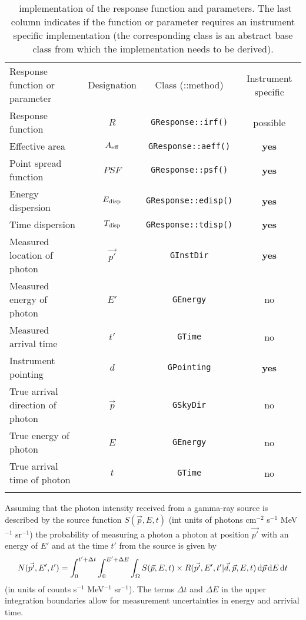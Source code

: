 \documentclass{article}[12pt,a4]
\begin{document}
\begin{table}[!h]
\caption{\this\ implementation of the response function and parameters. 
The last column indicates if the function or parameter requires an
instrument specific implementation (the corresponding class is an abstract base class
from which the implementation needs to be derived).
\label{tab:respar}}
\begin{center}
\begin{tabular}{lccc}
\hline
\hline
\noalign{\smallskip}
Response function or parameter & Designation & Class (::method) & Instrument specific \\
\noalign{\smallskip}
\hline
\noalign{\smallskip}
Response function & $R$ & {\tt GResponse::irf()} & possible \\
Effective area & $A_{\rm eff}$ & {\tt GResponse::aeff()} & {\bf yes} \\
Point spread function & $PSF$ & {\tt GResponse::psf()} & {\bf yes} \\
Energy dispersion & $E_{\rm disp}$ & {\tt GResponse::edisp()} & {\bf yes} \\
Time dispersion & $T_{\rm disp}$ & {\tt GResponse::tdisp()} & {\bf yes} \\
Measured location of photon & $\vec{p'}$ & {\tt GInstDir} & {\bf yes} \\
Measured energy of photon & $E'$ & {\tt GEnergy} & no \\
Measured arrival time & $t'$ & {\tt GTime} & no \\
Instrument pointing & $d$ & {\tt GPointing} & {\bf yes} \\
True arrival direction of photon & $\vec{p}$ & {\tt GSkyDir} & no \\
True energy of photon & $E$ & {\tt GEnergy} & no \\
True arrival time of photon & $t$ & {\tt GTime} & no \\
\noalign{\smallskip}
\hline
\end{tabular}
\end{center}
\end{table}

Assuming that the photon intensity received from a gamma-ray source is described by
the source function $S(\vec{p}, E, t)$ (int units of photons cm$^{-2}$ s$^{-1}$ MeV$^{-1}$ sr$^{-1}$)
the probability of measuring a photon a photon at position $\vec{p'}$ with an
energy of $E'$ and at the time $t'$ from the source is given by
\begin{equation}
N(\vec{p'}, E', t') = \int_{0}^{t'+\Delta t} \int_{0}^{E'+\Delta E} \int_{\Omega} 
S(\vec{p}, E, t) \times R(\vec{p'}, E', t' | \vec{d}, \vec{p}, E, t) \, {\rm d}\vec{p} \, {\rm d}E \,{\rm d}t
\end{equation}
(in units of counts s$^{-1}$ MeV$^{-1}$ sr$^{-1}$).
The terms $\Delta t$ and $\Delta E$ in the upper integration boundaries allow for measurement
uncertainties in energy and arrivial time.
\end{document}
